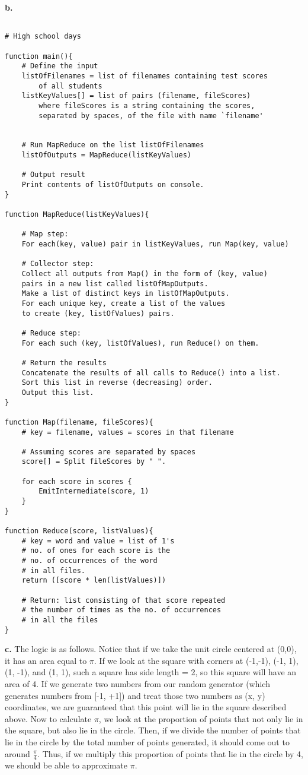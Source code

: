 \documentclass[12 pt]{article}
\begin{document}
	\noindent \textbf{b.}
	\begin{lstlisting}
	
# High school days 

function main(){
	# Define the input
	listOfFilenames = list of filenames containing test scores
		of all students
	listKeyValues[] = list of pairs (filename, fileScores)
		where fileScores is a string containing the scores,
		separated by spaces, of the file with name `filename'
	
	
	# Run MapReduce on the list listOfFilenames
	listOfOutputs = MapReduce(listKeyValues)

	# Output result
	Print contents of listOfOutputs on console.
}

function MapReduce(listKeyValues){

	# Map step:
	For each(key, value) pair in listKeyValues, run Map(key, value)

	# Collector step:
	Collect all outputs from Map() in the form of (key, value)
	pairs in a new list called listOfMapOutputs.
	Make a list of distinct keys in listOfMapOutputs.
	For each unique key, create a list of the values 
	to create (key, listOfValues) pairs.
	
	# Reduce step:
	For each such (key, listOfValues), run Reduce() on them.
	
	# Return the results
	Concatenate the results of all calls to Reduce() into a list.
	Sort this list in reverse (decreasing) order.
	Output this list. 
}

function Map(filename, fileScores){
	# key = filename, values = scores in that filename
	
	# Assuming scores are separated by spaces
	score[] = Split fileScores by " ".
	
	for each score in scores {
		EmitIntermediate(score, 1)
	}
}

function Reduce(score, listValues){
	# key = word and value = list of 1's
	# no. of ones for each score is the 
	# no. of occurrences of the word
	# in all files.
	return ([score * len(listValues)])
	
	# Return: list consisting of that score repeated
	# the number of times as the no. of occurrences
	# in all the files
}
	\end{lstlisting}
	
	\noindent \textbf{c.} The logic is as follows. Notice that if we take the unit circle centered at (0,0), it has an area equal to $\pi$. If we look at the square with corners at (-1,-1), (-1, 1), (1, -1), and (1, 1), such a square has side length = 2, so this square will have an area of 4. If we generate two numbers from our random generator (which generates numbers from [-1, +1]) and treat those two numbers as (x, y) coordinates, we are guaranteed that this point will lie in the square described above. Now to calculate $\pi$, we look at the proportion of points that not only lie in the square, but also lie in the circle. Then, if we divide the number of points that lie in the circle by the total number of points generated, it should come out to around $\frac{\pi}{4}$. Thus, if we multiply this proportion of points that lie in the circle by 4, we should be able to approximate $\pi$. \\
\end{document}
